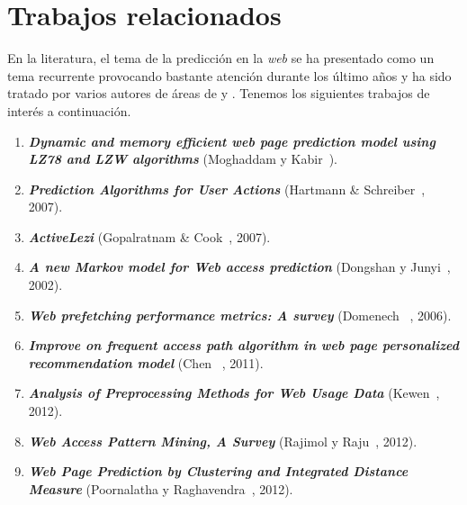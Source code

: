 \section{Trabajos relacionados}

En la literatura, el tema de la predicción en la \emph{web} se ha presentado como un tema recurrente provocando bastante atención durante los último años y ha sido tratado por varios autores de áreas de \machinelearning y \losslessdatacompression. Tenemos los siguientes trabajos de interés a continuación.

\vspace{1cm}


\begin{enumerate}

  \item \textbf{\emph{Dynamic and memory efficient web page prediction model using LZ78 and LZW algorithms}} (Moghaddam y Kabir~\cite{Moghaddam2009}). 


  \item \textbf{\emph{Prediction Algorithms for User Actions}} (Hartmann \& Schreiber~\cite{hartmann2007}, 2007). 
	
	
  \item \textbf{\emph{ActiveLezi}} (Gopalratnam  \& Cook~\cite{Gopalratnam2007}, 2007).  


  \item  \textbf{\emph{A new Markov model for Web access prediction}} (Dongshan y Junyi~\cite{Dongshan2002}, 2002). 
 
 
  \item \textbf{\emph{Web prefetching performance metrics: A survey}} (Domenech \etal~\cite{Domenech2006}, 2006). 
    
 
  \item \textbf{\emph{Improve on frequent access path algorithm in web page personalized recommendation model}} (Chen \etal~\cite{Chen2011}, 2011). 
  

  \item \textbf{\emph{Analysis of Preprocessing Methods for Web Usage Data}} (Kewen~\cite{kewen2012}, 2012). 


  \item \textbf{\emph{Web Access Pattern Mining, A Survey}} (Rajimol y Raju~\cite{Rajimol2012}, 2012). 
  

  \item \textbf{\emph{Web Page Prediction by Clustering and Integrated Distance Measure}} (Poornalatha y Raghavendra~\cite{Poornalatha2012}, 2012). 
  

  
\end{enumerate}




